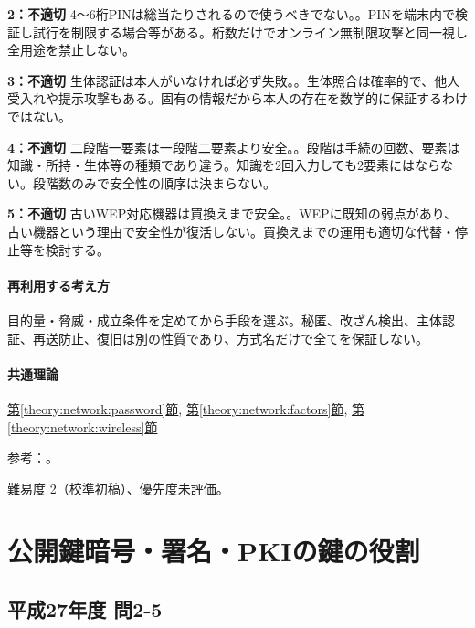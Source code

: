 \noindent\textbf{2：不適切} 4〜6桁PINは総当たりされるので使うべきでない。。PINを端末内で検証し試行を制限する場合等がある。桁数だけでオンライン無制限攻撃と同一視し全用途を禁止しない。\par

\noindent\textbf{3：不適切} 生体認証は本人がいなければ必ず失敗。。生体照合は確率的で、他人受入れや提示攻撃もある。固有の情報だから本人の存在を数学的に保証するわけではない。\par

\noindent\textbf{4：不適切} 二段階一要素は一段階二要素より安全。。段階は手続の回数、要素は知識・所持・生体等の種類であり違う。知識を2回入力しても2要素にはならない。段階数のみで安全性の順序は決まらない。\par

\noindent\textbf{5：不適切} 古いWEP対応機器は買換えまで安全。。WEPに既知の弱点があり、古い機器という理由で安全性が復活しない。買換えまでの運用も適切な代替・停止等を検討する。\par

\paragraph{再利用する考え方} 目的量・脅威・成立条件を定めてから手段を選ぶ。秘匿、改ざん検出、主体認証、再送防止、復旧は別の性質であり、方式名だけで全てを保証しない。

\paragraph{共通理論} \hyperref[theory:network:password]{第\ref*{theory:network:password}節}, \hyperref[theory:network:factors]{第\ref*{theory:network:factors}節}, \hyperref[theory:network:wireless]{第\ref*{theory:network:wireless}節}

\par 参考：\cite{net_nist2017,net_nist2025,net_wep}。

\par 難易度 2（校準初稿）、優先度未評価。

\section{公開鍵暗号・署名・PKIの鍵の役割}

\subsection{平成27年度 問2-5}
\label{q:h27-reg-basic-2-5}

